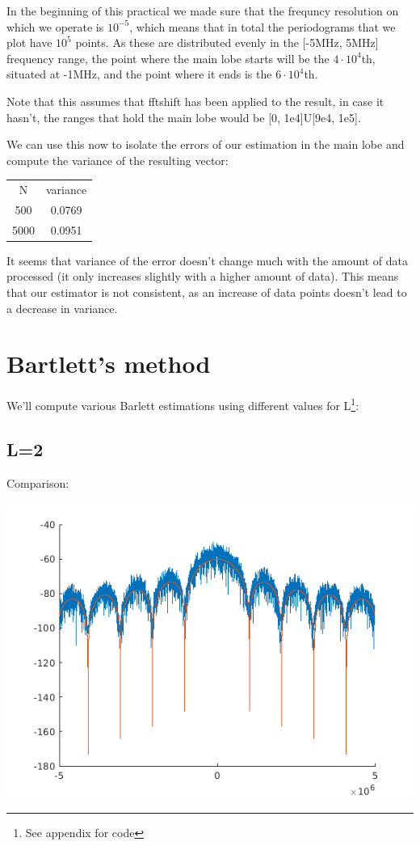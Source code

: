 \documentclass[conference,9pt]{IEEEtran}
\begin{document}
In the beginning of this practical we made sure that the frequncy resolution on which we operate is $10^{-5}$, which means that in total the periodograms that we plot have $10^{5}$ points. As these are distributed evenly in the [-5MHz, 5MHz] frequency range, the point where the main lobe starts will be the $4\cdot 10^4$th, situated at -1MHz, and the point where it ends is the $6\cdot 10^4$th.

Note that this assumes that fftshift has been applied to the result, in case it hasn't, the ranges that hold the main lobe would be [0, 1e4]U[9e4, 1e5].

We can use this now to isolate the errors of our estimation in the main lobe and compute the variance of the resulting vector:

\begin{center}
  \begin{tabular}{ c c }
   N & variance \\ 
   500 &  0.0769 \\  
   5000 & 0.0951    
  \end{tabular}
\end{center}

It seems that variance of the error doesn't change much with the amount of data processed (it only increases slightly with a higher amount of data). This means that our estimator is not consistent, as an increase of data points doesn't lead to a decrease in variance.

\section{Bartlett's method}
We'll compute various Barlett estimations using different values for L\footnote{See appendix for code}:

\subsection{L=2}
Comparison:

\includegraphics[scale=0.6]{barlett2.png}
\end{document}
